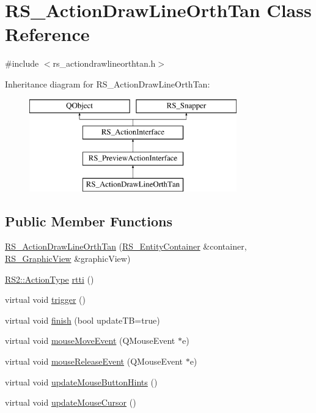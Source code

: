 \hypertarget{classRS__ActionDrawLineOrthTan}{\section{R\-S\-\_\-\-Action\-Draw\-Line\-Orth\-Tan Class Reference}
\label{classRS__ActionDrawLineOrthTan}
}


{\ttfamily \#include $<$rs\-\_\-actiondrawlineorthtan.\-h$>$}

Inheritance diagram for R\-S\-\_\-\-Action\-Draw\-Line\-Orth\-Tan\-:\begin{figure}[H]
\begin{center}
\leavevmode
\includegraphics[height=4.000000cm]{classRS__ActionDrawLineOrthTan}
\end{center}
\end{figure}
\subsection*{Public Member Functions}
\begin{DoxyCompactItemize}
\item 
\hyperlink{classRS__ActionDrawLineOrthTan_abe4d729ee57b48a3c528c581607e0529}{R\-S\-\_\-\-Action\-Draw\-Line\-Orth\-Tan} (\hyperlink{classRS__EntityContainer}{R\-S\-\_\-\-Entity\-Container} \&container, \hyperlink{classRS__GraphicView}{R\-S\-\_\-\-Graphic\-View} \&graphic\-View)
\item 
\hyperlink{classRS2_afe3523e0bc41fd637b892321cfc4b9d7}{R\-S2\-::\-Action\-Type} \hyperlink{classRS__ActionDrawLineOrthTan_a4cf69d2a3965864b4da9745fdbe58dcc}{rtti} ()
\item 
virtual void \hyperlink{classRS__ActionDrawLineOrthTan_a7154ec4665b5045be619786426a823d3}{trigger} ()
\item 
virtual void \hyperlink{classRS__ActionDrawLineOrthTan_a065fa12a4e597f67b7c9bc7bf8121022}{finish} (bool update\-T\-B=true)
\item 
virtual void \hyperlink{classRS__ActionDrawLineOrthTan_a4b01cdfdbcb04a7ad6ae7c2eac31069a}{mouse\-Move\-Event} (Q\-Mouse\-Event $\ast$e)
\item 
virtual void \hyperlink{classRS__ActionDrawLineOrthTan_a903a1419458b32176360ae2fbae12e2c}{mouse\-Release\-Event} (Q\-Mouse\-Event $\ast$e)
\item 
virtual void \hyperlink{classRS__ActionDrawLineOrthTan_affa2a5843188c1f9caba695dae6960a6}{update\-Mouse\-Button\-Hints} ()
\item 
virtual void \hyperlink{classRS__ActionDrawLineOrthTan_a61cdf5132b6f15b264eb74260778abdf}{update\-Mouse\-Cursor} ()
\end{DoxyCompactItemize}
